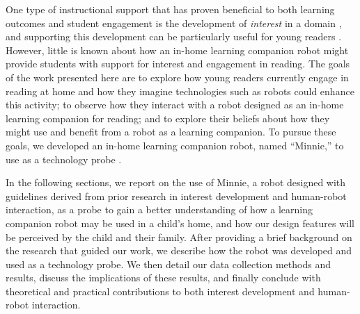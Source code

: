 \documentclass{sigchi}
\begin{document}
One type of instructional support that has proven beneficial to both learning outcomes and student engagement is the development of \textit{interest} in a domain \cite{Hidi:2006}, and supporting this development can be particularly useful for young readers \cite{Jones:2011}. However, little is known about how an in-home learning companion robot might provide students with support for interest and engagement in reading. {\color{Purple}The goals of the work presented here are} to explore how young readers currently engage in reading at home and how they imagine technologies such as robots could enhance this activity; to observe how they interact with a robot designed as an in-home learning companion for reading; and to explore their beliefs about how they might use and benefit from a robot as a learning companion. To pursue these goals, we developed an in-home learning companion robot, named ``Minnie,'' to use as a technology probe \cite{Hutchinson:2003}.


In the following sections, we report on the use of Minnie, a robot designed with guidelines derived from prior research in interest development and human-robot interaction, as a probe to gain a better understanding of how a learning companion robot may be used in a child's home, and how our design features will be perceived by the child and their family. After providing a brief background on the research that guided our work, we describe how the robot was developed and used as a technology probe. We then detail our data collection methods and results, discuss the implications of these results, and finally conclude with theoretical and practical contributions to both interest development and human-robot interaction.
\end{document}
